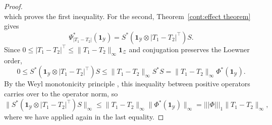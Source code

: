 \begin{proof}
\[    \]
    which proves the first inequality. For the second, Theorem~\ref{cont:effect theorem} gives \[\Psi_{|T_1-T_2|}^*(\mathbf{1}_{\mathcal{Y}})=S^*(\mathbf{1}_{\mathcal{Y}}\otimes |T_1-T_2|^\top)S.\] Since $0\leq |T_1-T_2|^\top\leq \|T_1-T_2\|_\infty\mathbf{1}_{\mathcal{Z}}$ and conjugation preserves the Loewner order,
    \[0\leq S^*(\mathbf{1}_{\mathcal{Y}}\otimes|T_1-T_2|^\top)S\leq \|T_1-T_2\|_\infty S^*S=\|T_1-T_2\|_\infty\Phi^*(\mathbf{1}_{\mathcal{Y}}).\] By the Weyl monotonicity principle \cite[Section~III.2]{bhatia1997matrix}, this inequality between positive operators carries over to the operator norm, so 
    \[
        \|S^*(\mathbf{1}_{\mathcal{Y}}\otimes |T_1-T_2|^\top) S\|_\infty\leq \|T_1-T_2\|_\infty\|\Phi^*(\mathbf{1}_{\mathcal{Y}})\|_\infty=|||\Phi|||_1\|T_1-T_2\|_\infty,
    \]
    where we have applied \cite[Proposition~3.6]{Paulsen2003} again in the last equality. 
\end{proof}
 

